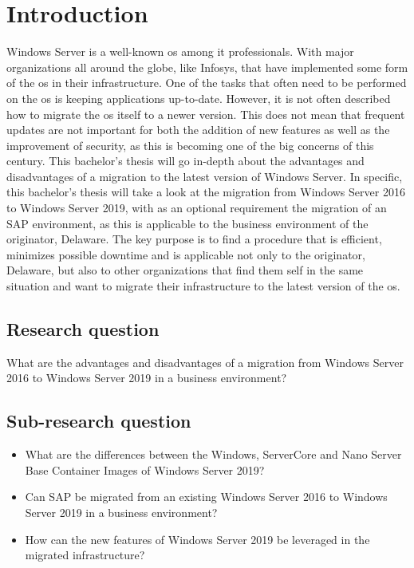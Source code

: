 \section{Introduction}\label{sec:introduction}
Windows Server is a well-known \acrfull{os} among \acrfull{it} professionals. With major organizations all around the globe, like Infosys, that have implemented some form of the \acrshort{os} in their infrastructure.\autocite{S.Chauhan2015}
One of the tasks that often need to be performed on the \acrshort{os} is keeping applications up-to-date. However, it is not often described how to migrate the \acrshort{os} itself to a newer version.  
This does not mean that frequent updates are not important for both the addition of new features as well as the improvement of security, as this is becoming one of the big concerns of this century. 
This bachelor's thesis will go in-depth about the advantages and disadvantages of a migration to the latest version of Windows Server. In specific, this bachelor's thesis will take a look at the migration from Windows Server 2016 to Windows Server 2019, with as an optional requirement the migration of an SAP environment, as this is applicable to the business environment of the originator, Delaware.
The key purpose is to find a procedure that is efficient, minimizes possible downtime and is applicable not only to the originator, Delaware, but also to other organizations that find them self in the same situation and want to migrate their infrastructure to the latest version of the \acrshort{os}.
\subsection{Research question}
What are the advantages and disadvantages of a migration from Windows Server 2016 to Windows Server 2019 in a business environment?
\subsection{Sub-research question}
\begin{itemize}
	\item What are the differences between the Windows, ServerCore and Nano Server Base Container Images of Windows Server 2019?
	\item Can SAP be migrated from an existing Windows Server 2016 to Windows Server 2019 in a business environment?
	\item How can the new features of Windows Server 2019 be leveraged in the migrated infrastructure? 
\end{itemize}
